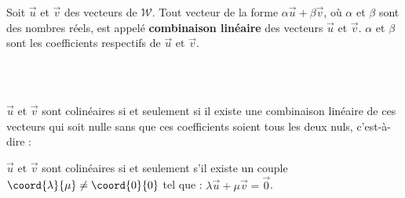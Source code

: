 \begin{definition}
\begin{minipage}{10cm}
	Soit $\vec{u}$ et $\vec{v}$ des vecteurs de $\mathcal{W}$. Tout vecteur de la forme $\alpha\vec{u}+\beta\vec{v}$, où $\alpha$ et $\beta$ sont des nombres réels, est appelé \textbf{combinaison linéaire} des vecteurs $\vec{u}$ et $\vec{v}$. $\alpha$ et $\beta$ sont les coefficients respectifs de $\vec{u}$ et $\vec{v}$.
\end{minipage}\hspace*{0.5cm}
\begin{minipage}{7cm}
\end{minipage}
\end{definition}\\\\
 \begin{propriete}
	$\vec{u}$ et $\vec{v}$ sont colinéaires si et seulement si il existe une combinaison linéaire de ces vecteurs qui soit nulle sans que ces coefficients soient tous les deux nuls, c'est-à-dire :
	\par $\vec{u}$ et $\vec{v}$ sont colinéaires si et seulement s'il existe un couple $\coord{\lambda}{\mu}\neq \coord{0}{0}$ tel que : $\lambda\vec{u}+\mu\vec{v}=\vec{0}$.
	\end{propriete}
